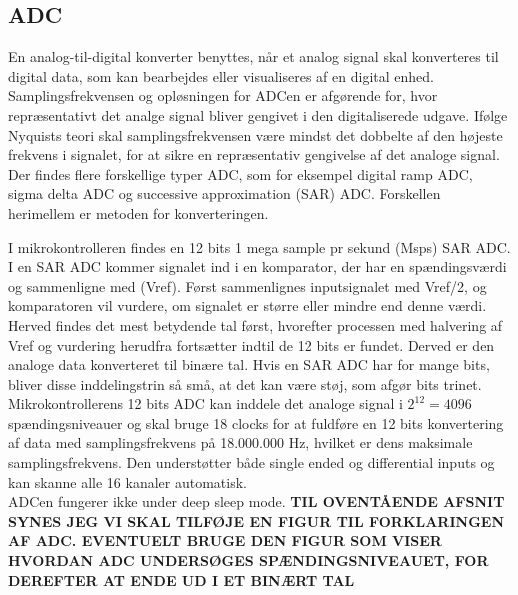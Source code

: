 \subsection{ADC}
En analog-til-digital konverter benyttes, når et analog signal skal konverteres til digital data, som kan bearbejdes eller visualiseres af en digital enhed. Samplingsfrekvensen og opløsningen for ADCen er afgørende for, hvor repræsentativt det analge signal bliver gengivet i den digitaliserede udgave. Ifølge Nyquists teori skal samplingsfrekvensen være mindst det dobbelte af den højeste frekvens i signalet, for at sikre en repræsentativ gengivelse af det analoge signal. Der findes flere forskellige typer ADC, som for eksempel digital ramp ADC, sigma delta ADC og successive approximation (SAR) ADC. Forskellen herimellem er metoden for konverteringen.  \citep{Moore2004,Sheingold2014}

I mikrokontrolleren findes en 12 bits 1 mega sample pr sekund (Msps) SAR ADC. I en SAR ADC kommer signalet ind i en komparator, der har en spændingsværdi og sammenligne med (Vref). Først sammenlignes inputsignalet med Vref/2, og komparatoren vil vurdere, om signalet er større eller mindre end denne værdi. Herved findes det mest betydende tal først, hvorefter processen med halvering af Vref og vurdering herudfra fortsætter indtil de 12 bits er fundet. Derved er den analoge data konverteret til binære tal. Hvis en SAR ADC har for mange bits, bliver disse inddelingstrin så små, at det kan være støj, som afgør bits trinet.\\
Mikrokontrollerens 12 bits ADC kan inddele det analoge signal i $2^{12} = 4096$ spændingsniveauer og skal bruge 18 clocks for at fuldføre en 12 bits konvertering af data med samplingsfrekvens på 18.000.000 Hz, hvilket er dens maksimale samplingsfrekvens. Den understøtter både single ended og differential inputs og kan skanne alle 16 kanaler automatisk. \citep{Semiconductor20164200M,Moore2004} \\
ADCen fungerer ikke under deep sleep mode. \citep{Semiconductor20164200M}
\newline \textbf{TIL OVENTÅENDE AFSNIT SYNES JEG VI SKAL TILFØJE EN FIGUR TIL FORKLARINGEN AF ADC. EVENTUELT BRUGE DEN FIGUR SOM VISER HVORDAN ADC UNDERSØGES SPÆNDINGSNIVEAUET, FOR DEREFTER AT ENDE UD I ET BINÆRT TAL}

